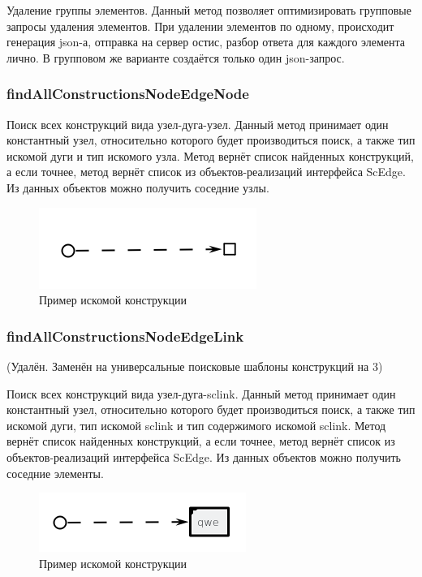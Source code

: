 Удаление группы элементов. Данный метод позволяет оптимизировать групповые запросы удаления элементов. При удалении элементов по одному, происходит генерация json-а, отправка на сервер остис, разбор ответа для каждого элемента лично. В групповом же варианте создаётся только один json-запрос. 
\subsubsection {findAllConstructionsNodeEdgeNode}

Поиск всех конструкций вида узел-дуга-узел. Данный метод принимает один константный узел, относительно которого будет производиться поиск, а также тип искомой дуги и тип искомого узла. Метод вернёт список найденных конструкций, а если точнее, метод вернёт список из объектов-реализаций интерфейса ScEdge. Из данных объектов можно получить соседние узлы. 
\begin{figure}[H]
    \centering
    \includegraphics{images/sc-context/node-edge-node.png}
    \caption{Пример искомой конструкции}
    \label{json_ex}
\end{figure}
\subsubsection {findAllConstructionsNodeEdgeLink} (Удалён. Заменён на универсальные поисковые шаблоны конструкций на 3)

Поиск всех конструкций вида узел-дуга-sclink. Данный метод принимает один константный узел, относительно которого будет производиться поиск, а также тип искомой дуги, тип искомой sclink и тип содержимого искомой sclink. Метод вернёт список найденных конструкций, а если точнее, метод вернёт список из объектов-реализаций интерфейса ScEdge. Из данных объектов можно получить соседние элементы. 
\begin{figure}[H]
    \centering
    \includegraphics{images/sc-context/node-edge-link.png}
    \caption{Пример искомой конструкции}
    \label{json_ex}
\end{figure}

